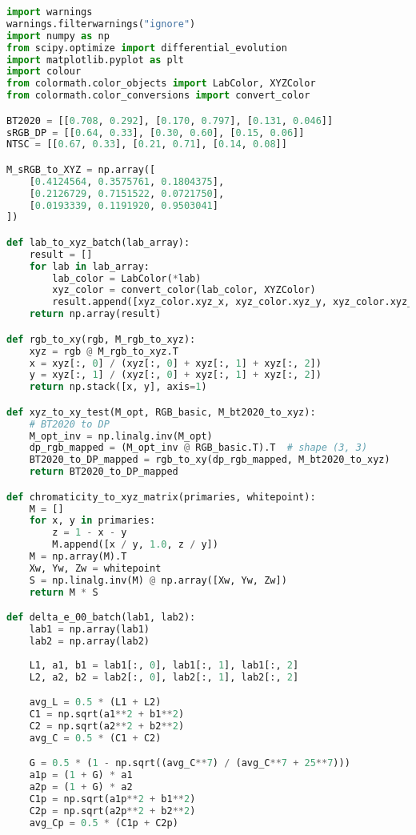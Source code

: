 \begin{lstlisting}[language=Python]
import warnings
warnings.filterwarnings("ignore")
import numpy as np
from scipy.optimize import differential_evolution
import matplotlib.pyplot as plt
import colour
from colormath.color_objects import LabColor, XYZColor
from colormath.color_conversions import convert_color

BT2020 = [[0.708, 0.292], [0.170, 0.797], [0.131, 0.046]]
sRGB_DP = [[0.64, 0.33], [0.30, 0.60], [0.15, 0.06]]
NTSC = [[0.67, 0.33], [0.21, 0.71], [0.14, 0.08]]

M_sRGB_to_XYZ = np.array([
    [0.4124564, 0.3575761, 0.1804375],
    [0.2126729, 0.7151522, 0.0721750],
    [0.0193339, 0.1191920, 0.9503041]
])

def lab_to_xyz_batch(lab_array):
    result = []
    for lab in lab_array:
        lab_color = LabColor(*lab)
        xyz_color = convert_color(lab_color, XYZColor)
        result.append([xyz_color.xyz_x, xyz_color.xyz_y, xyz_color.xyz_z])
    return np.array(result)

def rgb_to_xy(rgb, M_rgb_to_xyz):
    xyz = rgb @ M_rgb_to_xyz.T
    x = xyz[:, 0] / (xyz[:, 0] + xyz[:, 1] + xyz[:, 2])
    y = xyz[:, 1] / (xyz[:, 0] + xyz[:, 1] + xyz[:, 2])
    return np.stack([x, y], axis=1)

def xyz_to_xy_test(M_opt, RGB_basic, M_bt2020_to_xyz):
    # BT2020 to DP
    M_opt_inv = np.linalg.inv(M_opt)
    dp_rgb_mapped = (M_opt_inv @ RGB_basic.T).T  # shape (3, 3)
    BT2020_to_DP_mapped = rgb_to_xy(dp_rgb_mapped, M_bt2020_to_xyz)
    return BT2020_to_DP_mapped

def chromaticity_to_xyz_matrix(primaries, whitepoint):
    M = []
    for x, y in primaries:
        z = 1 - x - y
        M.append([x / y, 1.0, z / y])
    M = np.array(M).T
    Xw, Yw, Zw = whitepoint
    S = np.linalg.inv(M) @ np.array([Xw, Yw, Zw])
    return M * S

def delta_e_00_batch(lab1, lab2):
    lab1 = np.array(lab1)
    lab2 = np.array(lab2)
    
    L1, a1, b1 = lab1[:, 0], lab1[:, 1], lab1[:, 2]
    L2, a2, b2 = lab2[:, 0], lab2[:, 1], lab2[:, 2]

    avg_L = 0.5 * (L1 + L2)
    C1 = np.sqrt(a1**2 + b1**2)
    C2 = np.sqrt(a2**2 + b2**2)
    avg_C = 0.5 * (C1 + C2)

    G = 0.5 * (1 - np.sqrt((avg_C**7) / (avg_C**7 + 25**7)))
    a1p = (1 + G) * a1
    a2p = (1 + G) * a2
    C1p = np.sqrt(a1p**2 + b1**2)
    C2p = np.sqrt(a2p**2 + b2**2)
    avg_Cp = 0.5 * (C1p + C2p)


\end{lstlisting}
